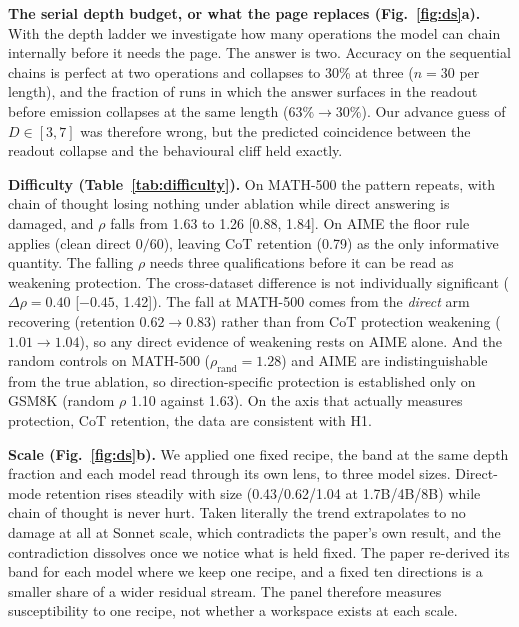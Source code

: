 \documentclass[10pt,a4paper]{article}
\begin{document}
\textbf{The serial depth budget, or what the page replaces (Fig.~\ref{fig:ds}a).} With the depth ladder we investigate how many operations the model can chain
internally before it needs the page. The answer is two. Accuracy on the sequential chains is perfect at two
operations and collapses to 30\% at three ($n{=}30$ per length), and the fraction of
runs in which the answer surfaces in the readout before emission collapses at the same
length ($63\%\to30\%$). Our advance guess of $D\in[3,7]$ was therefore wrong, but the
predicted coincidence between the readout collapse and the behavioural cliff held
exactly.

\textbf{Difficulty (Table~\ref{tab:difficulty}).} On MATH-500 the pattern repeats,
with chain of thought losing nothing under ablation while direct answering is damaged,
and $\rho$ falls from 1.63 to 1.26 [0.88, 1.84]. On AIME the floor rule applies (clean
direct $0/60$), leaving CoT retention (0.79) as the only informative quantity. The
falling $\rho$ needs three qualifications before it can be read as weakening protection.
The cross-dataset difference is not individually significant ($\Delta\rho=0.40$
[$-0.45$, 1.42]). The fall at MATH-500 comes from the \emph{direct} arm recovering
(retention $0.62\to0.83$) rather than from CoT protection weakening ($1.01\to1.04$), so
any direct evidence of weakening rests on AIME alone. And the random controls on
MATH-500 ($\rho_{\text{rand}}=1.28$) and AIME are indistinguishable from the true
ablation, so direction-specific protection is established only on GSM8K (random $\rho$
1.10 against 1.63). On the axis that actually measures protection, CoT retention, the
data are consistent with H1.

\textbf{Scale (Fig.~\ref{fig:ds}b).} We applied one fixed recipe, the band at the same
depth fraction and each model read through its own lens, to three model sizes.
Direct-mode retention rises steadily with size (0.43/0.62/1.04 at 1.7B/4B/8B) while
chain of thought is never hurt. Taken literally the trend extrapolates to no damage at
all at Sonnet scale, which contradicts the paper's own result, and the contradiction dissolves
once we notice what is held fixed. The paper re-derived its band for each
model where we keep one recipe, and a fixed ten directions is a smaller share of a wider
residual stream. The panel therefore measures susceptibility to one recipe, not whether
a workspace exists at each scale.
\end{document}
